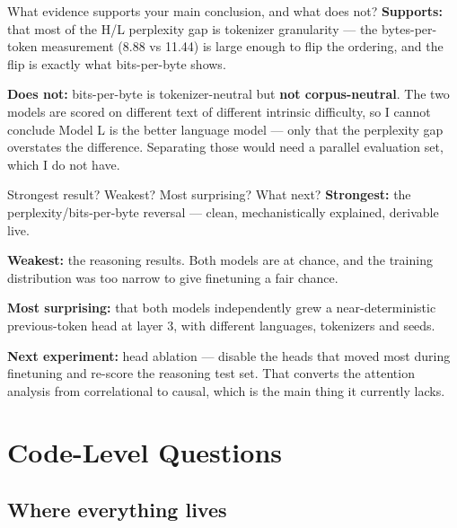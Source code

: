 \documentclass[11pt]{report}
\begin{document}
\begin{qabox}{What evidence supports your main conclusion, and what does not?}
\textbf{Supports:} that most of the H/L perplexity gap is tokenizer
granularity --- the bytes-per-token measurement (8.88 vs 11.44) is large enough
to flip the ordering, and the flip is exactly what bits-per-byte shows.

\smallskip
\textbf{Does not:} bits-per-byte is tokenizer-neutral but \textbf{not
corpus-neutral}. The two models are scored on different text of different
intrinsic difficulty, so I cannot conclude Model L is the better language model
--- only that the perplexity gap overstates the difference. Separating those
would need a parallel evaluation set, which I do not have.
\end{qabox}

\begin{qabox}{Strongest result? Weakest? Most surprising? What next?}
\textbf{Strongest:} the perplexity/bits-per-byte reversal --- clean,
mechanistically explained, derivable live.

\smallskip
\textbf{Weakest:} the reasoning results. Both models are at chance, and the
training distribution was too narrow to give finetuning a fair chance.

\smallskip
\textbf{Most surprising:} that both models independently grew a
near-deterministic previous-token head at layer 3, with different languages,
tokenizers and seeds.

\smallskip
\textbf{Next experiment:} head ablation --- disable the heads that moved most
during finetuning and re-score the reasoning test set. That converts the
attention analysis from correlational to causal, which is the main thing it
currently lacks.
\end{qabox}

\chapter{Code-Level Questions}

\section{Where everything lives}
\end{document}
